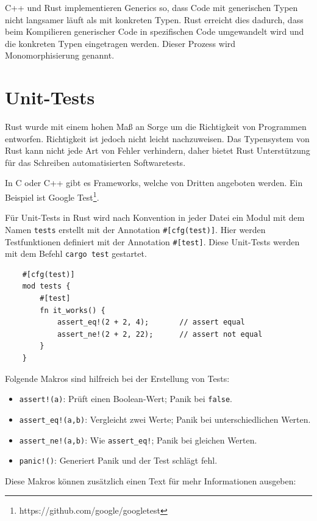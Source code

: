 C++ und Rust implementieren Generics so, dass Code mit generischen Typen nicht langsamer läuft als mit konkreten Typen. Rust erreicht dies dadurch, dass beim Kompilieren generischer Code in spezifischen Code umgewandelt wird und die konkreten Typen eingetragen werden. Dieser Prozess wird Monomorphisierung genannt.


\section{Unit-Tests}\label{chap:unittests}

Rust wurde mit einem hohen Maß an Sorge um die Richtigkeit von Programmen entworfen. Richtigkeit ist jedoch nicht leicht nachzuweisen. Das Typensystem von Rust kann nicht jede Art von Fehler verhindern, daher bietet Rust Unterstützung für das Schreiben automatisierten Softwaretests.

In C oder C++ gibt es Frameworks, welche von Dritten angeboten werden. Ein Beispiel ist Google Test\footnote{https://github.com/google/googletest}.

Für Unit-Tests in Rust wird nach Konvention in jeder Datei ein Modul mit dem Namen \verb"tests" erstellt mit der Annotation \verb"#[cfg(test)]". Hier werden Testfunktionen definiert mit der Annotation \verb"#[test]". Diese Unit-Tests werden mit dem Befehl \verb"cargo test" gestartet.

\begin{lstlisting}
    #[cfg(test)]
    mod tests {
        #[test]
        fn it_works() {
            assert_eq!(2 + 2, 4);       // assert equal
            assert_ne!(2 + 2, 22);      // assert not equal
        }
    }
\end{lstlisting}

Folgende Makros sind hilfreich bei der Erstellung von Tests:

\begin{itemize}
    \item \verb"assert!(a)": Prüft einen Boolean-Wert; Panik bei \verb"false".
    \item \verb"assert_eq!(a,b)": Vergleicht zwei Werte; Panik bei unterschiedlichen Werten.
    \item \verb"assert_ne!(a,b)": Wie \verb"assert_eq!"; Panik bei gleichen Werten.
    \item \verb"panic!()": Generiert Panik und der Test schlägt fehl.
\end{itemize}

Diese Makros können zusätzlich einen Text für mehr Informationen ausgeben:

